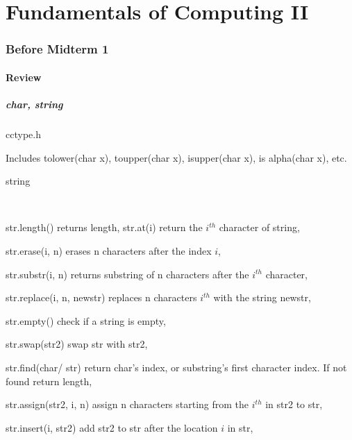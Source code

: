 \documentclass{article}
\begin{document}
\maketitle
{}

\newpage
\tableofcontents

\newpage
{}


\part{Fundamentals of Computing II}
\newpage

\section{Before Midterm 1} 

\subsection{Review}

\subsubsection{char, string}
\subparagraph{cctype.h} Includes tolower(char x), toupper(char x), isupper(char x), is alpha(char x), etc.

\subparagraph{string}
\

str.length() returns length, str.at(i) return the $ i^{th} $  character of string, 

str.erase(i, n) erases n characters after the index $ i $, 

str.substr(i, n) returns substring of n characters after the $ i^{th} $ character, 

str.replace(i, n, newstr) replaces n characters $ i^{th} $ with the string newstr, 

str.empty() check if a string is empty,

str.swap(str2) swap str with str2, 

str.find(char/ str) return char's index, or substring's first character index. If not found return length, 

str.assign(str2, i, n) assign n characters starting from the $ i^{th} $ in str2 to str, 

str.insert(i, str2) add str2 to str after the location $ i $ in str, 
\end{document}
